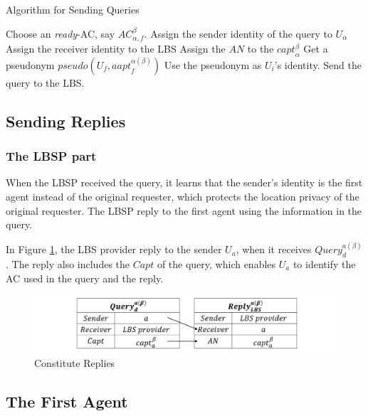 \begin{algorithm} [hbtp]
\caption{Algorithm for Sending Queries}\label{AlgSendACPQuery}
\begin{algorithmic}[1]
 {}
\State Choose an \textit{ready}-AC, say ${AC}_{\alpha,f}^{\beta}$.
\State Assign the sender identity of the query to $U_{\alpha}$
\State Assign the receiver identity to the LBS
\State Assign the $AN$ to the ${capt}_{\alpha}^{\beta}$
\State Get a pseudonym $pseudo\left(U_f,{aapt}_f^{\alpha \left(\beta \right)}\right)$
\State Use the pseudonym as $U_i$’s identity.
\State Send the query to the LBS.
\EndProcedure
\end{algorithmic}
\end{algorithm}

\subsection{ Sending Replies}


\subsubsection{ The LBSP part}

\noindent When the LBSP received the query, it learns that the sender's identity is the first agent instead of the original requester, which protects the location privacy of the original requester. The LBSP reply to the first agent using the information in the query.

In Figure \ref{fig:ConstituteReplies}, the LBS provider reply to the sender $U_a$, when it receives ${Query}^{a\left(\beta\right)}_d$. The reply also includes the $Capt$ of the query, which enables $U_a$ to identify the AC used in the query and the reply.

\begin{figure} [H]
  \centering 
  \includegraphics[width=6.0in]{figures/FIG_4_6_Constitute_Replies.png}
  \caption{Constitute Replies} 
  \label{fig:ConstituteReplies} %
\end{figure}

\subsection{ The First Agent}

